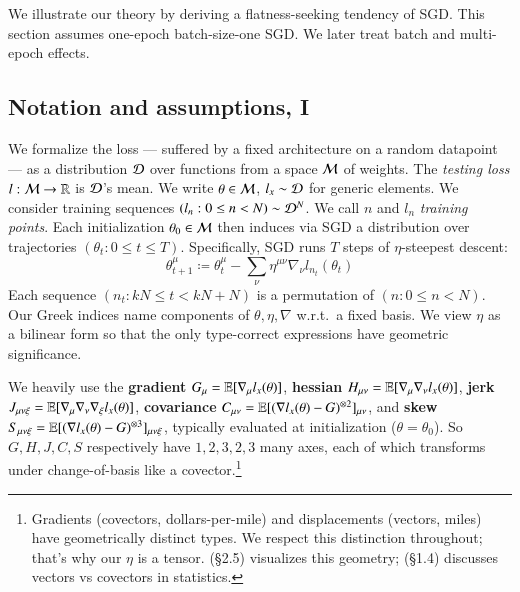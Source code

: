  We illustrate our theory by deriving a flatness-seeking tendency of SGD.
This section assumes one-epoch batch-size-one SGD.  We later 
treat batch and multi-epoch effects.

\subsection{Notation and assumptions, I}\label{sect:setup}

  We formalize the loss --- suffered by a fixed architecture on a random
datapoint --- as a distribution $\mathcal{D}$ over functions from a space $\mathcal{M}$ of
weights.  The \emph{testing loss} $l:\mathcal{M}\to\mathbb{R}$ is $\mathcal{D}$'s mean.  We write
$\theta\in\mathcal{M}$, $l_x\sim\mathcal{D}$ for generic elements.
%
We consider training sequences $(l_n: 0\leq n<N) \sim \mathcal{D}^N$.  We call
$n$ and $l_n$ \emph{training points}.
%
Each initialization $\theta_0 \in \mathcal{M}$ then induces via SGD a
distribution over trajectories $(\theta_t: 0\leq t \leq T)$.  Specifically,
SGD runs $T$ steps of $\eta$-steepest descent:
  \begin{equation*}
    \theta_{t+1}^\mu
    \coloneqq
    \theta_t^\mu -
    \sum_{\nu}
    \eta^{\mu\nu} \nabla_\nu l_{n_t}(\theta_t)
  \end{equation*}
Each sequence $(n_t: kN\leq t<kN+N)$ is a permutation of $(n:
0\leq n<N)$.  Our Greek indices name components of
$\theta,\eta,\nabla$ w.r.t.\ a fixed basis.  We view $\eta$
as a bilinear form
so that the only type-correct expressions have geometric significance.
%

We heavily use the
\textbf{gradient} $G_\mu = \mathbb{E}[\nabla_\mu l_x(\theta)]$, %
\textbf{hessian} $H_{\mu\nu} = \mathbb{E}[\nabla_\mu\nabla_\nu l_x(\theta)]$, %
\textbf{jerk} \squish $J_{\mu\nu\xi} = \mathbb{E}[\nabla_\mu\nabla_\nu\nabla_\xi l_x(\theta)]$, %
\textbf{covariance} $C_{\mu\nu} = \mathbb{E}[(\nabla l_x(\theta) - G)^{\otimes 2}]_{\mu\nu}$, %
and
\textbf{skew} \squash $S_{\mu\nu\xi} = \mathbb{E}[(\nabla l_x(\theta) - G)^{\otimes 3}]_{\mu\nu\xi}$, %
typically evaluated at
initialization ($\theta=\theta_0$).
So $G, H, J, C, S$ respectively have $1, 2, 3, 2, 3$ many axes, each of which
transforms under change-of-basis like a covector.\footnote{
    Gradients
    (covectors, dollars-per-mile) and displacements (vectors, miles) have geometrically
    distinct types.  We respect this distinction throughout; that's
    why our $\eta$ is a tensor.
    \cite{mi73} (\S2.5) visualizes this geometry;
    \cite{cu87} (\S1.4) discusses vectors vs covectors in statistics.
}

